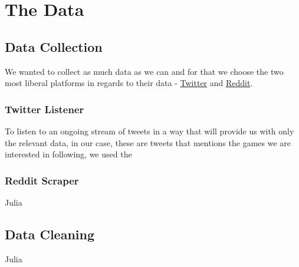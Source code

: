 \section{The Data}



\subsection{Data Collection}
We wanted to collect as much data as we can and for that we choose the two most liberal platforms in regards to their data - \href{http://www.twitter.com}{Twitter} and \href{http://www.reddit.com}{Reddit}.

\subsubsection{Twitter Listener}
To listen to an ongoing stream of tweets in a way that will provide us with only the relevant data, in our case, these are tweets that mentions the games we are interested in following, we used the 

\subsubsection{Reddit Scraper}
Julia

\subsection{Data Cleaning}
Julia
